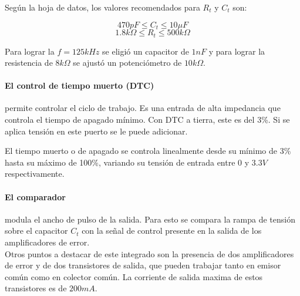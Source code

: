 Según la hoja de datos, los valores recomendados para $R_t$ y $C_t$ son:

$$470pF\leq C_t\leq 10\mu F$$
$$1.8k\Omega\leq R_t\leq 500k\Omega$$

Para lograr la $f=125kHz$ se eligió un capacitor de $1nF$ y para lograr la resistencia de $8k\Omega$ se ajustó un potenciómetro de $10k\Omega$. 

\paragraph{El control de tiempo muerto (DTC)} permite controlar el ciclo de trabajo. 
Es una entrada de alta impedancia que controla el tiempo de apagado mínimo. Con DTC a tierra, este es del 3\%.
Si se aplica tensión en este puerto se le puede adicionar.

El tiempo muerto o de apagado se controla linealmente desde su mínimo de 3\% hasta su máximo de 100\%, 
variando su tensión de entrada entre $0$ y $3.3V$ respectivamente. 

\paragraph{El comparador} modula el ancho de pulso de la salida.
Para esto se compara la rampa de tensión sobre el capacitor $C_t$ con la señal de control
presente en la salida de los amplificadores de error.\\

Otros puntos a destacar de este integrado son la presencia de dos amplificadores de error y de dos transistores de salida,
que pueden trabajar tanto en emisor común como en colector común. La corriente de salida maxima de estos transistores es de $200mA.$




